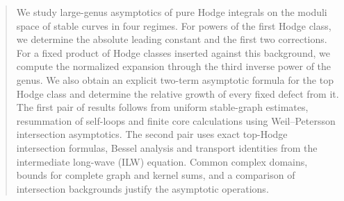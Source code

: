 \begin{abstract}
We study large-genus asymptotics of pure Hodge integrals on the
moduli space of stable curves in four regimes. For powers of the
first Hodge class, we determine the absolute leading constant and
the first two corrections. For a fixed product of Hodge classes
inserted against this background, we compute the normalized expansion
through the third inverse power of the genus. We also obtain an explicit two-term
asymptotic formula for the top Hodge class and determine the
relative growth of every fixed defect from it. The first pair of
results follows from uniform stable-graph estimates, resummation
of self-loops and finite core calculations using Weil--Petersson
intersection asymptotics. The second pair uses exact top-Hodge
intersection formulas, Bessel analysis and transport identities
from the intermediate long-wave (ILW) equation. Common complex domains, bounds for complete
graph and kernel sums, and a comparison of intersection
backgrounds justify the asymptotic operations.
\end{abstract}
